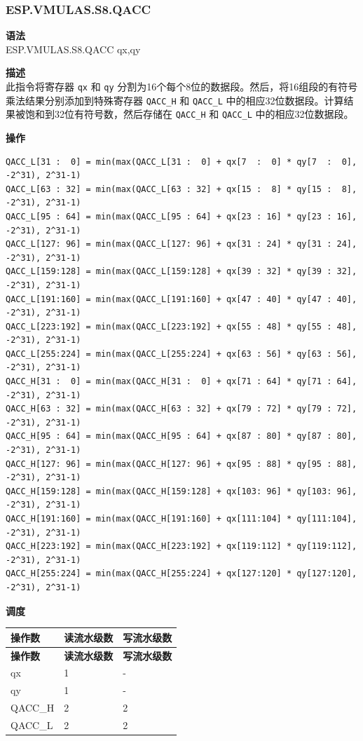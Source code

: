 \newpage
\subsubsection{ESP.VMULAS.S8.QACC}\label{instruction:ESPVMULASS8QACC}
\textbf{语法}\\
ESP.VMULAS.S8.QACC qx,qy

\textbf{描述}\\
此指令将寄存器 \lstinline{qx} 和 \lstinline{qy} 分割为16个每个8位的数据段。然后，将16组段的有符号乘法结果分别添加到特殊寄存器 \lstinline{QACC_H} 和 \lstinline{QACC_L} 中的相应32位数据段。计算结果被饱和到32位有符号数，然后存储在 \lstinline{QACC_H} 和 \lstinline{QACC_L} 中的相应32位数据段。

\textbf{操作}\\
\begin{lstlisting}
QACC_L[31 :  0] = min(max(QACC_L[31 :  0] + qx[7  :  0] * qy[7  :  0], -2^31), 2^31-1)
QACC_L[63 : 32] = min(max(QACC_L[63 : 32] + qx[15 :  8] * qy[15 :  8], -2^31), 2^31-1)
QACC_L[95 : 64] = min(max(QACC_L[95 : 64] + qx[23 : 16] * qy[23 : 16], -2^31), 2^31-1)
QACC_L[127: 96] = min(max(QACC_L[127: 96] + qx[31 : 24] * qy[31 : 24], -2^31), 2^31-1)
QACC_L[159:128] = min(max(QACC_L[159:128] + qx[39 : 32] * qy[39 : 32], -2^31), 2^31-1)
QACC_L[191:160] = min(max(QACC_L[191:160] + qx[47 : 40] * qy[47 : 40], -2^31), 2^31-1)
QACC_L[223:192] = min(max(QACC_L[223:192] + qx[55 : 48] * qy[55 : 48], -2^31), 2^31-1)
QACC_L[255:224] = min(max(QACC_L[255:224] + qx[63 : 56] * qy[63 : 56], -2^31), 2^31-1)
QACC_H[31 :  0] = min(max(QACC_H[31 :  0] + qx[71 : 64] * qy[71 : 64], -2^31), 2^31-1)
QACC_H[63 : 32] = min(max(QACC_H[63 : 32] + qx[79 : 72] * qy[79 : 72], -2^31), 2^31-1)
QACC_H[95 : 64] = min(max(QACC_H[95 : 64] + qx[87 : 80] * qy[87 : 80], -2^31), 2^31-1)
QACC_H[127: 96] = min(max(QACC_H[127: 96] + qx[95 : 88] * qy[95 : 88], -2^31), 2^31-1)
QACC_H[159:128] = min(max(QACC_H[159:128] + qx[103: 96] * qy[103: 96], -2^31), 2^31-1)
QACC_H[191:160] = min(max(QACC_H[191:160] + qx[111:104] * qy[111:104], -2^31), 2^31-1)
QACC_H[223:192] = min(max(QACC_H[223:192] + qx[119:112] * qy[119:112], -2^31), 2^31-1)
QACC_H[255:224] = min(max(QACC_H[255:224] + qx[127:120] * qy[127:120], -2^31), 2^31-1)

\end{lstlisting}

\textbf{调度}\\
\begin{longtable}[c]{|l|l|l|}
    \hline
    \rowcolor{lightgray}
    \textbf{操作数} & \textbf{读流水级数} & \textbf{写流水级数} \\\hline
    \endfirsthead
    \hline
    \rowcolor{lightgray}
     \textbf{操作数} & \textbf{读流水级数} & \textbf{写流水级数} \\\hline
    \endhead
    \hline
    \endfoot

     qx & 1 & - \\\hline
     qy & 1 & - \\\hline
     QACC\_H & 2 & 2 \\\hline
     QACC\_L & 2 & 2

\end{longtable}

